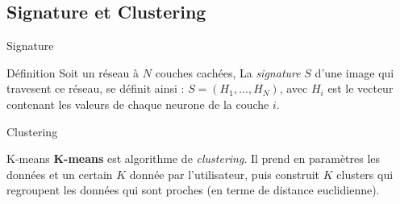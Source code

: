 \documentclass[10pt,handout]{beamer}
\newif\ifplacelogo %
\begin{document}
\placelogofalse 
\subsection{Signature et Clustering}
\begin{frame}{Signature}
    \begin{block}{Définition}
        Soit un réseau à $N$ couches cachées, La \textit{signature} $S$ d'une image qui travesent ce réseau, se définit ainsi : $ S = (H_1, ..., H_N) $, avec $H_i$ est le vecteur contenant les valeurs de chaque neurone de la couche $i$.
    \end{block}
\end{frame}
\placelogotrue 

\placelogofalse 
\begin{frame}{Clustering}
    \begin{block}{K-means}
        \textbf{K-means} est algorithme de \textit{clustering}. Il prend en paramètres les
        données et un certain $K$ donnée par l’utilisateur, puis construit $K$ clusters qui regroupent les données qui sont proches (en terme de distance euclidienne).
    \end{block}
\end{frame}
\placelogotrue 
\end{document}
